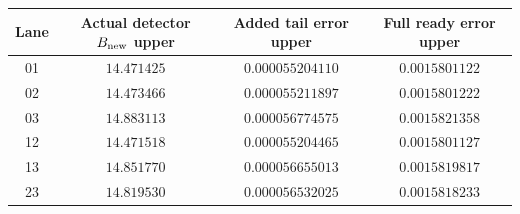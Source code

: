 \begin{tabular}{@{}c c c c@{}}
\toprule
Lane & Actual detector $B_{\rm new}$ upper & Added tail error upper & Full ready error upper\\
\midrule
01 & $14.471425$ & $0.000055204110$ & $0.0015801122$ \\
02 & $14.473466$ & $0.000055211897$ & $0.0015801222$ \\
03 & $14.883113$ & $0.000056774575$ & $0.0015821358$ \\
12 & $14.471518$ & $0.000055204465$ & $0.0015801127$ \\
13 & $14.851770$ & $0.000056655013$ & $0.0015819817$ \\
23 & $14.819530$ & $0.000056532025$ & $0.0015818233$ \\
\bottomrule
\end{tabular}

